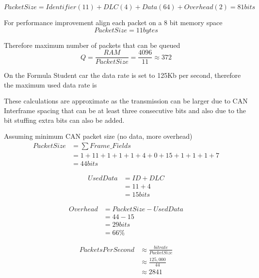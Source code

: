 \documentclass[11pt]{report} %
\begin{document}
		\begin{equation}
		Packet Size = Identifier(11) + DLC(4) + Data(64) + Overhead (2) = 81bits
		\end{equation}

		For performance improvement align each packet on a 8 bit memory space
		\begin{equation}
		Packet Size = 11 bytes
		\end{equation}

		Therefore maximum number of packets that can be queued
		\begin{equation}
		Q = \frac{RAM}{PacketSize} = \frac{4096}{11} \approx 372
		\end{equation}

		On the Formula Student car the data rate is set to 125Kb per second, therefore the
		maximum used data rate is

		These calculations are approximate as the transmission can be larger due to CAN
		Interframe spacing that can be at least three consecutive bits and also due to
		the bit stuffing extra bits can also be added.

		Assuming minimum CAN packet size (no data, more overhead)
		\begin{equation}
		\begin{aligned}
		PacketSize &= \sum{Frame\_Fields}\\
		&= 1 + 11 + 1 + 1 + 1 + 4 + 0 + 15 + 1 + 1 + 1 + 7 \\
		&= 44bits
		\end{aligned}
		\end{equation}

		\begin{equation}
		\begin{aligned}
		UsedData &= ID + DLC\\
		&= 11 + 4\\
		&= 15bits
		\end{aligned}
		\end{equation}

		\begin{equation}
		\begin{aligned}
		Overhead &= PacketSize - UsedData\\
		&= 44 - 15\\
		&= 29bits\\
		&= 66\%
		\end{aligned}
		\end{equation}

		\begin{equation}
		\begin{aligned}
		PacketsPerSecond &\approx \frac{bit rate}{PacketSize}\\
		&\approx \frac{125,000}{44}\\
		&\approx 2841
		\end{aligned}
		\end{equation}
\end{document}
